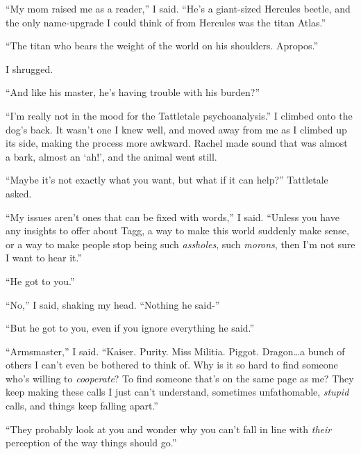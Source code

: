 ``My mom raised me as a reader,'' I said.  ``He's a giant-sized Hercules beetle, and the only name-upgrade I could think of from Hercules was the titan Atlas.''



``The titan who bears the weight of the world on his shoulders.  Apropos.''



I shrugged.



``And like his master, he's having trouble with his burden?''



``I'm really not in the mood for the Tattletale psychoanalysis.''  I climbed onto the dog's back.  It wasn't one I knew well, and moved away from me as I climbed up its side, making the process more awkward.  Rachel made sound that was almost a bark, almost an `ah!', and the animal went still.



``Maybe it's not exactly what you want, but what if it can help?''  Tattletale asked.



``My issues aren't ones that can be fixed with words,'' I said.  ``Unless you have any insights to offer about Tagg, a way to make this world suddenly make sense, or a way to make people stop being such \emph{assholes}, such \emph{morons}, then I'm not sure I want to hear it.''



``He got to you.''



``No,'' I said, shaking my head.  ``Nothing he said-''



``But he got to you, even if you ignore everything he said.''



``Armsmaster,'' I said.  ``Kaiser.  Purity.  Miss Militia.  Piggot.  Dragon\ldots a bunch of others I can't even be bothered to think of.  Why is it so hard to find someone who's willing to \emph{cooperate}?  To find someone that's on the same page as me?  They keep making these calls I just can't understand, sometimes unfathomable, \emph{stupid} calls, and things keep falling apart.''



``They probably look at you and wonder why you can't fall in line with \emph{their} perception of the way things should go.''



